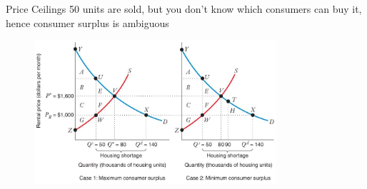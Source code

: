 \documentclass[11pt,t]{beamer}
\begin{document}
\begin{frame}{Price Ceilings}
  50 units are sold, but you don't know which consumers can buy it, hence consumer surplus is ambiguous
  \begin{figure}
    \includegraphics[width=0.8\textwidth]{figures/fig10_7a.jpg}
  \end{figure}
\end{frame}
\end{document}
